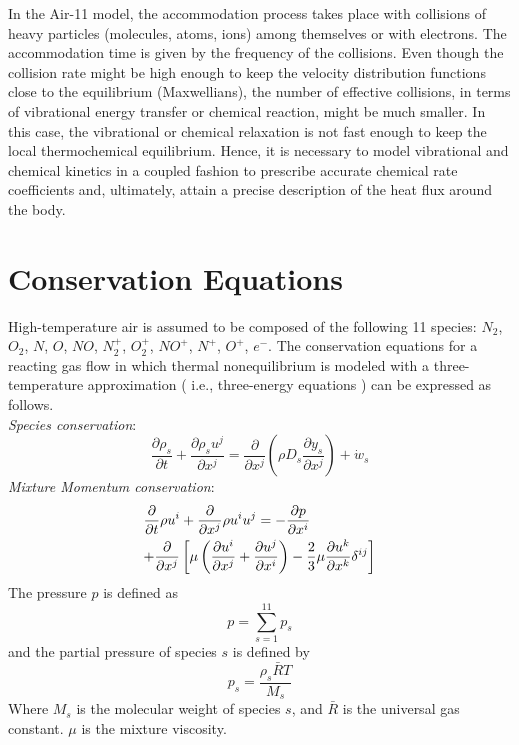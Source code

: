 \documentclass[11pt,a4paper,twocolumn]{article}
\begin{document}
In the Air-11 model, the accommodation process takes place with collisions of heavy particles (molecules, atoms, ions) among themselves or with electrons. The accommodation time is given by the frequency of the collisions. Even though the collision rate might be high enough to keep the velocity distribution functions close to the equilibrium (Maxwellians), the number of effective collisions, in terms of vibrational energy transfer or chemical reaction, might be much smaller. In this case, the vibrational or chemical relaxation is not fast enough to keep the local thermochemical equilibrium. Hence, it is necessary to model vibrational and chemical kinetics in a coupled fashion to prescribe accurate chemical rate coefficients and, ultimately, attain a precise description of the heat flux around the body.


\section{Conservation Equations}
\label{sec:equations}
High-temperature air is assumed to be composed of the following 11 species: $N_2$, $O_2$, $N$, $O$, $NO$, $N_2^+$, $O_2^+$, $NO^+$, $N^+$, $O^+$, $e^-$. The conservation equations for a reacting gas flow in which thermal nonequilibrium is modeled with a three-temperature approximation ( i.e., three-energy equations ) can be expressed as follows.\\

\textit{Species conservation}:
\begin{equation}\label{eq:species}
      \frac{\partial \rho_s}{\partial t}+\frac{\partial \rho_s u^j}{\partial x^j}=\frac{\partial}{\partial x^j}(\rho D_s\frac{\partial y_s}{\partial x^j})+\dot w_s
\end{equation}
\textit{Mixture Momentum conservation}:
\begin{multline}\label{eq:momentum}
    \frac{\partial}{\partial t}\rho u^i+\frac{\partial}{\partial x^j}\rho u^i u^j=-\frac{\partial p}{\partial x^i} \hfill\\+\frac{\partial}{\partial x^j}\left [ \mu \left(\frac{\partial u^i}{\partial x^j}+\frac{\partial u^j}{\partial x^i}\right)-\frac{2}{3}\mu\frac{\partial u^k}{\partial x^k} \delta^{ij}\right ] \hfill
\end{multline}
The pressure $p$ is defined as
\begin{equation}
    p = \sum_{s=1}^{11}p_s
\end{equation}
and the partial pressure of species $s$ is defined by
\begin{equation}
    p_s = \frac{\rho_s\bar R T}{M_s}
\end{equation}
Where $M_s$ is the molecular weight of species $s$, and $\bar R$ is the universal gas constant. $\mu$ is the mixture viscosity.\\ 
\end{document}
